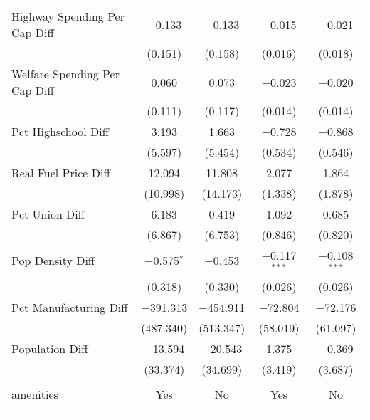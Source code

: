 \begin{table}[!htbp]
\begin{tabular}{@{\extracolsep{5pt}}lcccc}
  Highway Spending Per Cap Diff & $-$0.133 & $-$0.133 & $-$0.015 & $-$0.021 \\ 
  & (0.151) & (0.158) & (0.016) & (0.018) \\ 
  Welfare Spending Per Cap Diff & 0.060 & 0.073 & $-$0.023 & $-$0.020 \\ 
  & (0.111) & (0.117) & (0.014) & (0.014) \\ 
  Pct Highschool Diff & 3.193 & 1.663 & $-$0.728 & $-$0.868 \\ 
  & (5.597) & (5.454) & (0.534) & (0.546) \\ 
  Real Fuel Price Diff & 12.094 & 11.808 & 2.077 & 1.864 \\ 
  & (10.998) & (14.173) & (1.338) & (1.878) \\ 
  Pct Union Diff & 6.183 & 0.419 & 1.092 & 0.685 \\ 
  & (6.867) & (6.753) & (0.846) & (0.820) \\ 
  Pop Density Diff & $-$0.575$^{*}$ & $-$0.453 & $-$0.117$^{***}$ & $-$0.108$^{***}$ \\ 
  & (0.318) & (0.330) & (0.026) & (0.026) \\ 
  Pct Manufacturing Diff & $-$391.313 & $-$454.911 & $-$72.804 & $-$72.176 \\ 
  & (487.340) & (513.347) & (58.019) & (61.097) \\ 
  Population Diff & $-$13.594 & $-$20.543 & 1.375 & $-$0.369 \\ 
  & (33.374) & (34.699) & (3.419) & (3.687) \\ 
 \hline \\[-1.8ex] 
amenities & Yes & No & Yes & No \\ 
\hline \\[-1.8ex] 
\hline 
\hline \\[-1.8ex] 
\end{tabular} 
\end{table} 
